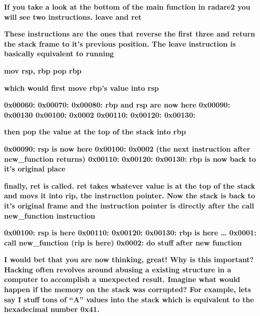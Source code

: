 \documentclass[letterpaper]{article}
\newcommand{\sitfig}[3]{
\begin{figure}[H]
\centering
\makebox[\textwidth][c]{
#2
}
\label{#1}
\end{figure}
}
\newcommand{\sitgfx}[4][scale=1.0]{
\sitfig{#3}{\texttt{[image: \#2]}}{#4}
}
\begin{document}
\textbf{If you take a look at the bottom of the main function in radare2 you will see two instructions. leave and ret}

  
\sitgfx[width=5.8335in,height=3.6457in]{reversing-img089.png}{fig:unk}{TODO CAPTION}
 

\textbf{These instructions are the ones that reverse the first three and return the stack frame to it's previous
position. The leave instruction is basically equivalent to running}

\textbf{mov rsp, rbp\newline
pop rbp}

\textbf{which would first move rbp's value into rsp}

\textbf{0x00060:\newline
0x00070:\newline
0x00080: rbp and rsp are now here\newline
0x00090: 0x00130\newline
0x00100: 0x0002\newline
0x00110:\newline
0x00120:\newline
0x00130:}

\textbf{then pop the value at the top of the stack into rbp}

\textbf{0x00090: rsp is now here\newline
0x00100: 0x0002 (the next instruction after new\_function returns)\newline
0x00110:\newline
0x00120:\newline
0x00130: rbp is now back to it's original place}

\textbf{finally, ret is called. ret takes whatever value is at the top of the stack and movs it into rip, the
instruction pointer. Now the stack is back to it's original frame and the instruction pointer is directly after the
call new\_function instruction}

\textbf{0x00100: rsp is here\newline
0x00110:\newline
0x00120:\newline
0x00130: rbp is here\newline
{\dots}\newline
0x0001: call new\_function\newline
(rip is here)\newline
0x0002: do stuff after new function}

\textbf{I would bet that you are now thinking, great! Why is this important? Hacking often revolves around abusing a
existing structure in a computer to accomplish a unexpected result. Imagine what would happen if the memory on the
stack was corrupted? For example, lets say I stuff tons of ``A'' values into the stack which is equivalent to the
hexadecimal number 0x41.}
\end{document}
